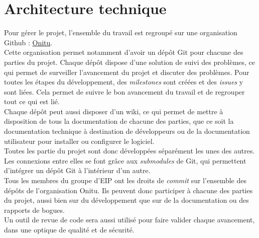 \section{Architecture technique}
Pour gérer le projet, l'ensemble du travail est regroupé sur une organisation Github : \href{https://github.com/onitu/}{Onitu}.\\

Cette organisation permet notamment d'avoir un dépôt Git pour chacune des parties du projet. Chaque dépôt dispose d'une solution de suivi des problèmes, ce qui permet de surveiller l'avancement du projet et discuter des problèmes.
Pour toutes les étapes du développement, des \textit{milestones} sont créées et des \textit{issues} y sont liées. Cela permet de suivre le bon avancement du travail et de regrouper tout ce qui est lié.\\

Chaque dépôt peut aussi disposer d'un wiki, ce qui permet de mettre à disposition de tous la documentation de chacune des parties, que ce soit la documentation technique à destination de développeurs ou de la documentation utilisateur pour installer ou configurer le logiciel.\\

Toutes les partie du projet sont donc développées séparément les unes des autres. Les connexions entre elles se font grâce aux \textit{submodules} de Git, qui permettent
 d'intégrer un dépôt Git à l'intérieur d'un autre.\\

Tous les membres du groupe d'EIP ont les droits de \textit{commit} sur l'ensemble des dépôts de l'organisation Onitu. Ils peuvent donc participer à chacune des parties du projet, aussi bien sur du développement que sur de la documentation ou des rapports de bogues.\\

Un outil de revue de code sera aussi utilisé pour faire valider chaque avancement, dans une optique de qualité et de sécurité.
